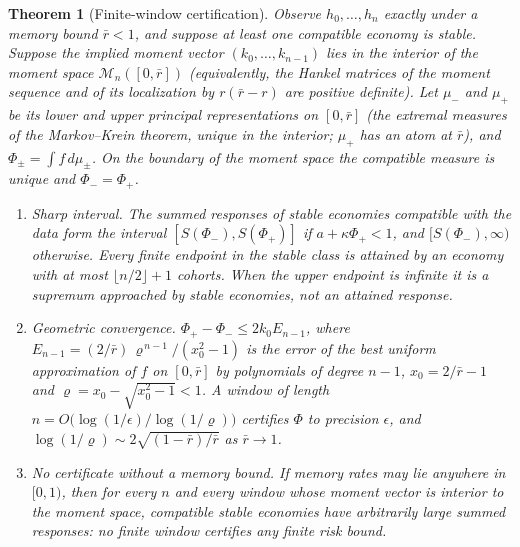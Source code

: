 \documentclass[12pt]{article}
\newtheorem{theorem}{Theorem}[section]
\theoremstyle{definition}
\theoremstyle{remark}
\begin{document}
\begin{theorem}[Finite-window certification]\label{thm:window}
Observe $h_0,\ldots,h_n$ exactly under a memory bound $\bar r<1$, and suppose at least one compatible economy is stable. Suppose the implied moment vector $(k_0,\ldots,k_{n-1})$ lies in the interior of the moment space $\mathcal M_n([0,\bar r])$ (equivalently, the Hankel matrices of the moment sequence and of its localization by $r(\bar r-r)$ are positive definite). Let $\mu_-$ and $\mu_+$ be its lower and upper principal representations on $[0,\bar r]$ (the extremal measures of the Markov--Krein theorem, unique in the interior; $\mu_+$ has an atom at $\bar r$), and $\Phi_\pm=\int f\,d\mu_\pm$. On the boundary of the moment space the compatible measure is unique and $\Phi_-=\Phi_+$.
\begin{enumerate}[label=(\roman*)]
\item \emph{Sharp interval.} The summed responses of stable economies compatible with the data form the interval $[S(\Phi_-),S(\Phi_+)]$ if $a+\kappa\Phi_+<1$, and $[S(\Phi_-),\infty)$ otherwise. Every finite endpoint in the stable class is attained by an economy with at most $\lfloor n/2\rfloor+1$ cohorts. When the upper endpoint is infinite it is a supremum approached by stable economies, not an attained response.
\item \emph{Geometric convergence.} $\Phi_+-\Phi_-\le2k_0E_{n-1}$, where $E_{n-1}=(2/\bar r)\,\varrho^{\,n-1}/(x_0^2-1)$ is the error of the best uniform approximation of $f$ on $[0,\bar r]$ by polynomials of degree $n-1$, $x_0=2/\bar r-1$ and $\varrho=x_0-\sqrt{x_0^2-1}<1$. A window of length $n=O\bigl(\log(1/\epsilon)/\log(1/\varrho)\bigr)$ certifies $\Phi$ to precision $\epsilon$, and $\log(1/\varrho)\sim2\sqrt{(1-\bar r)/\bar r}$ as $\bar r\to1$.
\item \emph{No certificate without a memory bound.} If memory rates may lie anywhere in $[0,1)$, then for every $n$ and every window whose moment vector is interior to the moment space, compatible stable economies have arbitrarily large summed responses: no finite window certifies any finite risk bound.
\end{enumerate}
\end{theorem}
\end{document}
